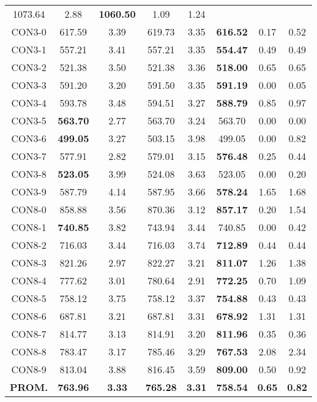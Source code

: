 \begin{table}[ht]
\begin{tabular}{c c c c c c c c}
1073.64 & 2.88 & \bf{1060.50} & 
1.09 & 1.24\\CON3-0 & 617.59 & 3.39 & 
619.73 & 3.35 & \bf{616.52} & 
0.17 & 0.52\\CON3-1 & 557.21 & 3.41 & 
557.21 & 3.35 & \bf{554.47} & 
0.49 & 0.49\\CON3-2 & 521.38 & 3.50 & 
521.38 & 3.36 & \bf{518.00} & 
0.65 & 0.65\\CON3-3 & 591.20 & 3.20 & 
591.50 & 3.35 & \bf{591.19} & 
0.00 & 0.05\\CON3-4 & 593.78 & 3.48 & 
594.51 & 3.27 & \bf{588.79} & 
0.85 & 0.97\\CON3-5 & \bf{563.70} & 2.77 & 
563.70 & 3.24 & 563.70 & 0.00
 & 0.00\\
CON3-6 & \bf{499.05} & 3.27 & 
503.15 & 3.98 & 499.05 & 0.00
 & 0.82\\CON3-7 & 577.91 & 2.82 & 
579.01 & 3.15 & \bf{576.48} & 
0.25 & 0.44\\CON3-8 & \bf{523.05} & 3.99 & 
524.08 & 3.63 & 523.05 & 0.00
 & 0.20\\CON3-9 & 587.79 & 4.14 & 
587.95 & 3.66 & \bf{578.24} & 
1.65 & 1.68\\CON8-0 & 858.88 & 3.56 & 
870.36 & 3.12 & \bf{857.17} & 
0.20 & 1.54\\CON8-1 & \bf{740.85} & 3.82 & 
743.94 & 3.44 & 740.85 & 0.00
 & 0.42\\CON8-2 & 716.03 & 3.44 & 
716.03 & 3.74 & \bf{712.89} & 
0.44 & 0.44\\CON8-3 & 821.26 & 2.97 & 
822.27 & 3.21 & \bf{811.07} & 
1.26 & 1.38\\CON8-4 & 777.62 & 3.01 & 
780.64 & 2.91 & \bf{772.25} & 
0.70 & 1.09\\CON8-5 & 758.12 & 3.75 & 
758.12 & 3.37 & \bf{754.88} & 
0.43 & 0.43\\CON8-6 & 687.81 & 3.21 & 
687.81 & 3.31 & \bf{678.92} & 
1.31 & 1.31\\CON8-7 & 814.77 & 3.13 & 
814.91 & 3.20 & \bf{811.96} & 
0.35 & 0.36\\CON8-8 & 783.47 & 3.17 & 
785.46 & 3.29 & \bf{767.53} & 
2.08 & 2.34\\CON8-9 & 813.04 & 3.88 & 
816.45 & 3.59 & \bf{809.00} & 
0.50 & 0.92\\\bf{PROM.} & 
\bf{763.96} & \bf{3.33} & \bf{765.28} & \bf{3.31} & \bf{758.54} & \bf{0.65} & \bf{0.82}\\[1ex]\hline
\end{tabular}
\label{table:nonlin}
\end{table} \clearpage

